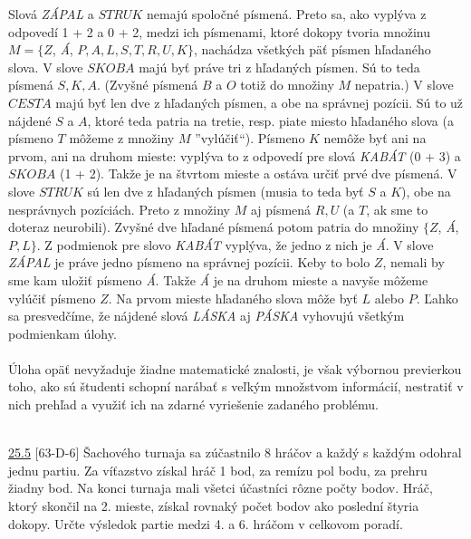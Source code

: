 \rieh Slová \textit{ZÁPAL} a $STRUK$ nemajú spoločné písmená. Preto sa, ako vyplýva z odpovedí 1 + 2 a 0 + 2, medzi ich písmenami, ktoré dokopy tvoria množinu $M= \{Z$, \textit{Á}, $P, A, L, S, T, R, U, K\}$, nachádza všetkých päť písmen hľadaného slova. V slove $SKOBA$ majú byť práve tri z hľadaných písmen. Sú to teda písmená $S, K, A$. (Zvyšné písmená $B$ a $O$ totiž do množiny $M$ nepatria.) V slove $CESTA$ majú byť len dve z hľadaných písmen, a obe na správnej pozícii. Sú to už nájdené $S$ a $A$, ktoré teda patria na tretie, resp. piate miesto hľadaného slova (a písmeno $T$ môžeme z množiny $M$ ”vylúčiť“). Písmeno $K$ nemôže byť ani na prvom, ani na druhom mieste: vyplýva to z odpovedí pre slová \textit{KABÁT} (0 + 3) a $SKOBA$ (1 + 2). Takže je na štvrtom mieste a ostáva určiť prvé dve písmená. V slove $STRUK$ sú len dve z hľadaných písmen (musia to teda byť $S$ a $K$), obe na nesprávnych pozíciách. Preto z množiny $M$  aj písmená $R, U$ (a $T$, ak sme to doteraz neurobili). Zvyšné dve hľadané písmená potom patria do množiny $\{Z$, \textit{Á}, $P, L\}$. Z podmienok pre slovo \textit{KABÁT} vyplýva, že jedno z nich je \textit{Á}. V slove \textit{ZÁPAL} je práve jedno písmeno na správnej pozícii. Keby to bolo $Z$, nemali by sme kam uložiť písmeno \textit{Á}. Takže \textit{Á} je na druhom mieste a navyše môžeme vylúčiť písmeno $Z$. Na prvom mieste hľadaného slova môže byť $L$ alebo $P$. Ľahko sa presvedčíme, že nájdené slová \textit{LÁSKA} aj \textit{PÁSKA} vyhovujú všetkým podmienkam úlohy.\\
\\
\kom Úloha opäť nevyžaduje žiadne matematické znalosti, je však výbornou previerkou toho, ako sú študenti schopní narábať s veľkým množstvom informácií, nestratiť v nich prehľad a využiť ich na zdarné vyriešenie zadaného problému. \\
\\

\begin{tcolorbox}[breakable,notitle,boxrule=0pt,colback=light-gray,colframe=light-gray]\ul{25.5} [63-D-6]
Šachového turnaja sa zúčastnilo 8 hráčov a každý s každým odohral jednu partiu. Za víťazstvo získal hráč 1 bod, za remízu pol bodu, za prehru žiadny bod. Na konci turnaja mali všetci účastníci rôzne počty bodov. Hráč, ktorý skončil na 2. mieste, získal rovnaký počet bodov ako poslední štyria dokopy. Určte výsledok partie medzi 4. a 6. hráčom v celkovom poradí.

\end{tcolorbox}

